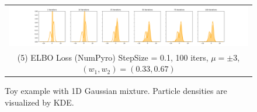 \begin{figure}[!htbp]
    
    \begin{tabular}{@{}c@{}}
        \includegraphics[width=\toyfigwidth]{figs/toy-figure1-numpyro.png} \\
        \small (5) ELBO Loss (NumPyro) StepSize = 0.1, 100 iters, $\mu = \pm 3$, $(w_1, w_2) = (0.33, 0.67)$
    \end{tabular}
     
    \caption{Toy example with 1D Gaussian mixture. Particle densities are visualized by KDE.}
    \label{fig:toy1dgaussian}
\end{figure}

